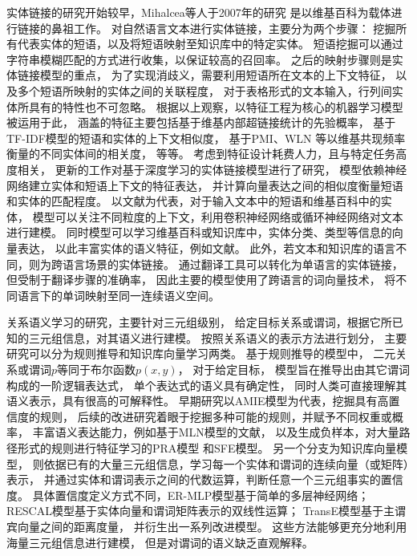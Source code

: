 实体链接的研究开始较早，Mihalcea等人\cite{mihalcea2007wikify}于2007年的研究
是以维基百科为载体进行链接的鼻祖工作。
对自然语言文本进行实体链接，主要分为两个步骤：
挖掘所有代表实体的短语，以及将短语映射至知识库中的特定实体。
短语挖掘可以通过字符串模糊匹配的方式进行收集，以保证较高的召回率。
之后的映射步骤则是实体链接模型的重点，
为了实现消歧义，需要利用短语所在文本的上下文特征，
以及多个短语所映射的实体之间的关联程度，
对于表格形式的文本输入，行列间实体所具有的特性也不可忽略。
根据以上观察，以特征工程为核心的机器学习模型被运用于此，
涵盖的特征主要包括基于维基内部超链接统计的先验概率，
基于TF-IDF模型\cite{guo2013link}的短语和实体的上下文相似度，
基于PMI\cite{ratinov2011local}、WLN\cite{shen2012linden}
等以维基共现频率衡量的不同实体间的相关度，
等等。
考虑到特征设计耗费人力，且与特定任务高度相关，
更新的工作对基于深度学习的实体链接模型进行了研究，
模型依赖神经网络建立实体和短语上下文的特征表达，
并计算向量表达之间的相似度衡量短语和实体的匹配程度。
以文献\parencite{francis2016capturing}为代表，对于输入文本中的短语和维基百科中的实体，
模型可以关注不同粒度的上下文，利用卷积神经网络或循环神经网络对文本进行建模。
同时模型可以学习维基百科或知识库中，实体分类、类型等信息的向量表达，
以此丰富实体的语义特征，例如文献\parencite{sun2015modeling,gupta2017entity,nguyen2016joint}。
此外，若文本和知识库的语言不同，则为跨语言场景的实体链接。
通过翻译工具可以转化为单语言的实体链接，但受制于翻译步骤的准确率，
因此主要的模型使用了跨语言的词向量技术\parencite{ruder2017survey}，
将不同语言下的单词映射至同一连续语义空间。


关系语义学习的研究，主要针对三元组级别，
给定目标关系或谓词，根据它所已知的三元组信息，对其语义进行建模。
按照关系语义的表示方法进行划分，
主要研究可以分为规则推导和知识库向量学习两类。
基于规则推导的模型中，
二元关系或谓词$p$等同于布尔函数$p(x, y)$，
对于给定目标，
模型旨在推导出由其它谓词构成的一阶逻辑表达式，%
单个表达式的语义具有确定性，
同时人类可直接理解其语义表示，具有很高的可解释性。
早期研究以AMIE模型\cite{galarraga2013amie}为代表，挖掘具有高置信度的规则，
后续的改进研究着眼于挖掘多种可能的规则，并赋予不同权重或概率，
丰富语义表达能力，例如基于MLN模型的文献\parencite{jiang2012learning,zhang2012ontological}，
以及生成负样本，对大量路径形式的规则进行特征学习的PRA模型\cite{lao2011random}
和SFE模型\cite{gardner2015efficient}。
另一个分支为知识库向量模型，
则依据已有的大量三元组信息，学习每一个实体和谓词的连续向量（或矩阵）表示，
并通过实体和谓词表示之间的代数运算，判断任意一个三元组事实的置信度。
具体置信度定义方式不同，ER-MLP模型\cite{dong2014knowledge}基于简单的多层神经网络；
RESCAL模型\cite{nickel2012factorizing}基于实体向量和谓词矩阵表示的双线性运算；
TransE模型\cite{bordes2013translating}基于主谓宾向量之间的距离度量，
并衍生出一系列改进模型\parencite{wang2014knowledge,lin2015learning,xiao2016transg}。
这些方法能够更充分地利用海量三元组信息进行建模，
但是对谓词的语义缺乏直观解释。


